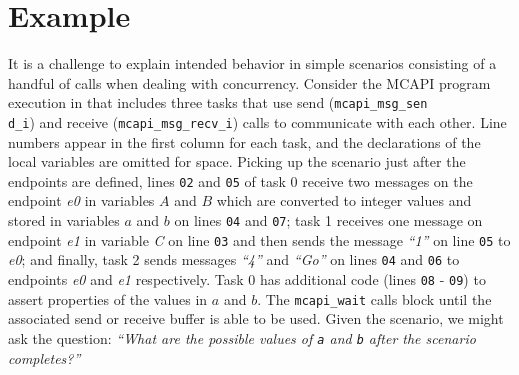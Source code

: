 \section{Example}

It is a challenge to explain intended behavior in simple scenarios
consisting of a handful of calls when dealing with concurrency. Consider
the MCAPI program execution in  that includes three
tasks that use send (\texttt{mcapi\_msg\_sen\\d\_i}) and receive
(\texttt{mcapi\_msg\_recv\_i}) calls to communicate with each other.
Line numbers appear in the first column for each task, and the
declarations of the local variables are omitted for space. Picking up
the scenario just after the endpoints are defined, lines \texttt{02}
and \texttt{05} of task 0 receive two messages on the endpoint
\textit{e0} in variables $A$ and $B$ which are
converted to integer values and stored in variables $a$ and
$b$ on lines \texttt{04} and \texttt{07}; task 1 receives one
message on endpoint \textit{e1} in variable \textit{C} on line
\texttt{03} and then sends the message \textit{``1''} on line \texttt{05} to
\textit{e0}; and finally, task 2 sends messages \textit{``4''} and \textit{``Go''} on
lines \texttt{04} and \texttt{06} to endpoints \textit{e0} and
\textit{e1} respectively. Task 0 has additional code (lines \texttt{08} -
\texttt{09}) to assert properties of the values in $a$ and
$b$. The \texttt{mcapi\_wait} calls block until the associated
send or receive buffer is able to be used. Given the scenario, we
might ask the question: \emph{``What are the possible values of
\texttt{a} and \texttt{b} after the scenario completes?''}

